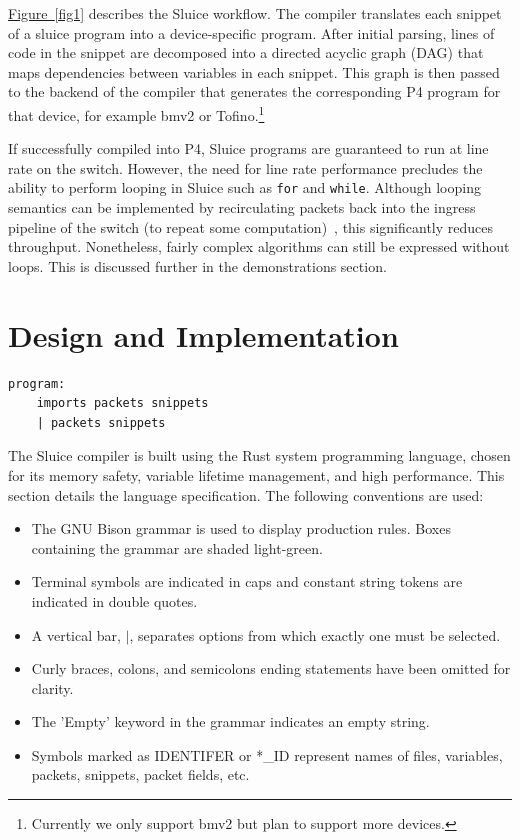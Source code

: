 \documentclass[12pt, oneside]{article}
\newcommand{\irref}[2]{\hyperref[#2]{#1~\ref{#2}}}
\begin{document}
\irref{Figure}{fig1} describes the Sluice workflow. The compiler translates each snippet of
a sluice program into a device-specific program. After initial parsing, lines
of code in the snippet are decomposed into a directed acyclic graph (DAG) that
maps dependencies between variables in each snippet. This graph is then passed
to the backend of the compiler that generates the corresponding P4 program for
that device, for example bmv2 or Tofino.\footnote{Currently we only support
bmv2 but plan to support more devices.} 

If successfully compiled into P4, Sluice programs are guaranteed to run at line rate on the switch. However, the need for line rate performance precludes the ability to perform looping in Sluice such as \texttt{for} and \texttt{while}. Although looping semantics can be implemented by recirculating packets back into the ingress pipeline of the switch (to repeat some computation)~\cite{p4Spec}, this significantly reduces throughput. Nonetheless, fairly complex algorithms can still be expressed without loops. This is discussed further in the demonstrations section. 

\newpage
\section{Design and Implementation}

\begin{lstlisting}[basicstyle=\linespread{1.3}\scriptsize,  numberstyle=\tiny, backgroundcolor = \color{teagreen}, frame=tlrb]
program:
	imports packets snippets				
	| packets snippets
\end{lstlisting}

The Sluice compiler is built using the Rust system programming language, chosen for its memory safety, variable lifetime management, and high performance. This section details the language specification. The following conventions are used:

\begin{itemize}
  \item The GNU Bison grammar is used to display production rules. Boxes containing the grammar are shaded light-green.
  \item Terminal symbols are indicated in caps and constant string tokens are indicated in double quotes.
  \item A vertical bar, $|$, separates options from which exactly one must be selected.
  \item Curly braces, colons, and semicolons ending statements have been omitted for clarity.
  \item The 'Empty' keyword in the grammar indicates an empty string.
  \item Symbols marked as IDENTIFER or *\_ID represent names of files, variables, packets, snippets, packet fields, etc.
\end{itemize}
\end{document}
